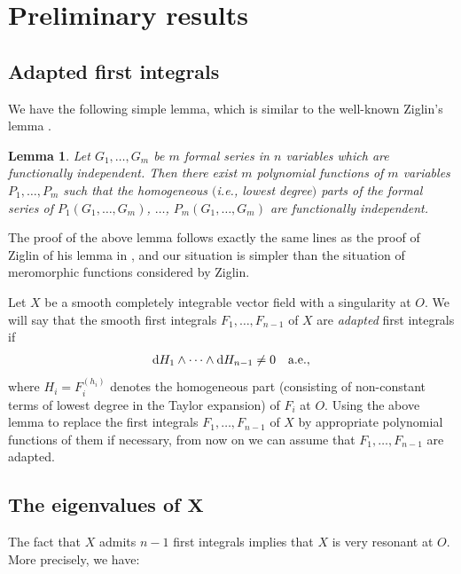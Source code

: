 \documentclass[11pt]{article}
\numberwithin{equation}{section}
\newtheorem{lem}[thm]{Lemma}
\begin{document}
\section{Preliminary results}\label{section2}

\subsection{Adapted f\/irst integrals}\label{subsection:adapted}

We have the following simple lemma, which is similar to
the well-known Ziglin's lemma \cite{Ziglin-Branching1982}.

\begin{lem}
 Let $G_1,\dots,G_m$ be $m$ formal series in $n$ variables which are functionally independent. Then
there exist $m$ polynomial functions of $m$ variables $P_1,\dots, P_m$ such that the homogeneous
$($i.e., lowest degree$)$ parts of the formal series of $P_1(G_1,\dots,G_m)$, $\dots$, $P_m(G_1,\dots,G_m)$ are functionally independent.
\end{lem}

The proof of the above lemma follows exactly the same lines as the proof of Ziglin of his lemma in
\cite{Ziglin-Branching1982}, and our situation is simpler than the situation of meromorphic
functions considered by Ziglin.

Let $X$ be a smooth completely integrable vector f\/ield with a singularity at $O$.
We will say that the smooth f\/irst integrals $F_1, \dots, F_{n-1}$ of $X$
are \emph{adapted} f\/irst integrals if
\begin{gather*}
 {\rm d}H_1 \wedge \dots \wedge {\rm d}H_{n-1} \neq 0 \quad \text{a.e.},
\end{gather*}
where $H_i = F_i^{(h_i)}$ denotes the homogeneous part (consisting of non-constant terms of lowest degree in the Taylor
expansion) of $F_i$ at $O$.
Using the above lemma to replace the f\/irst integrals $F_1, \dots, F_{n-1}$ of $X$ by appropriate
polynomial functions of them if necessary, from now on we can assume that $F_1,\dots, F_{n-1}$ are adapted.

\subsection[The eigenvalues of $X$]{The eigenvalues of $\boldsymbol{X}$}

The fact that $X$ admits $n-1$ f\/irst integrals implies that $X$ is very resonant at $O$. More precisely, we have:
\end{document}
